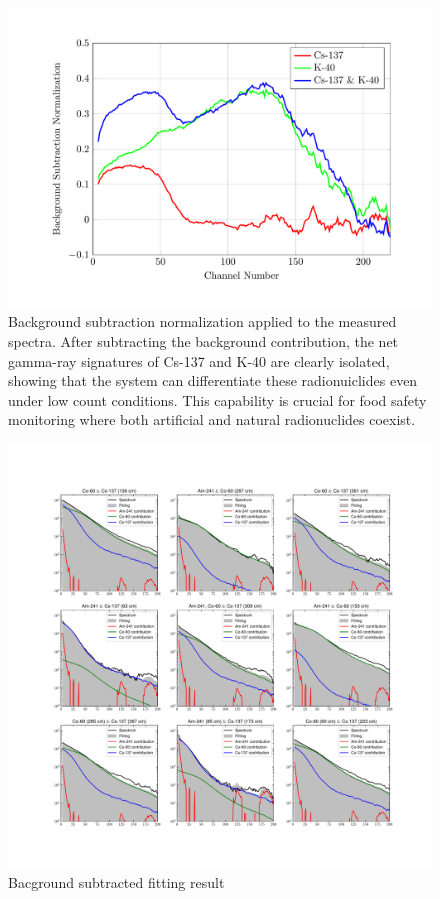 \documentclass[10pt]{wlscirep}
\begin{document}
\begin{figure}[ht]
\centering
\includegraphics[width=\linewidth]{figure/fig09_FI_CSRN.pdf}
\caption{Background subtraction normalization applied to the measured spectra. After subtracting the background contribution, the net gamma-ray signatures of Cs-137 and K-40 are clearly isolated, showing that the system can differentiate these radionuiclides even under low count conditions. This capability is crucial for food safety monitoring where both artificial and natural radionuclides coexist.}
\label{fig:fi_csbs}
\end{figure}



\begin{figure}[ht]
\centering
\includegraphics[width=\linewidth]{figure/fit_BGSub.pdf}
\caption{Bacground subtracted fitting result}
\label{fig:fi_fitbgsub}
\end{figure}
\end{document}
